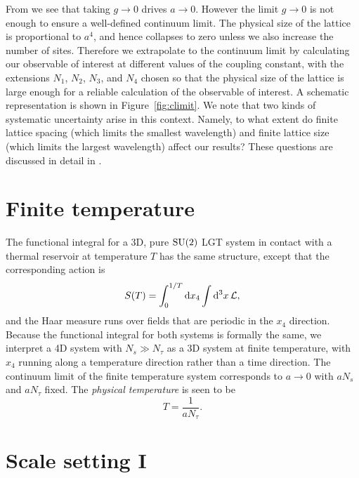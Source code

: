 From  we see that taking $g\to0$ drives $a\to0$.
However the limit $g\to0$ is not enough to ensure a well-defined continuum
limit. The physical size of the lattice is proportional to $a^4$, and hence
collapses to zero unless we also increase the number of sites. Therefore
we extrapolate to the continuum limit by calculating our observable
of interest at different values of the coupling constant, with the 
extensions $N_1$, $N_2$, $N_3$, and $N_4$ chosen so that the physical 
size of the lattice is large enough for a reliable calculation of 
the observable of interest. A schematic representation is shown in
Figure~\ref{fig:climit}. We note that two kinds of systematic uncertainty 
arise in this context. Namely, to what extent do finite lattice
spacing (which limits the smallest wavelength) and finite lattice
size (which limits the largest wavelength) affect our results?
These questions are discussed in detail in 
.

\section{Finite temperature}\label{sec:finitetemp}

The functional integral for a 3D, 
pure $\operatorname{SU}(2)$ LGT system in contact with a thermal reservoir at 
temperature $T$ has the same structure, except that the corresponding 
action is
\begin{equation}\label{eq:Tintegral}
  S(T)=\int_0^{1/T}\dd{x_4}\int\dd[3]{x}\mathcal{L},
\end{equation}
and the Haar measure runs over fields that are periodic in the
$x_4$ direction. Because the functional integral for both systems is
formally the same, we interpret a 4D system with $N_s\gg N_\tau$ as
a 3D system at finite temperature, with $x_4$ running along a 
temperature direction rather than a time direction. 
The continuum limit of the finite temperature system corresponds
to $a\to0$ with $aN_s$ and $aN_\tau$ fixed. The {\it physical
temperature} is seen to be
\begin{equation}
  T=\frac{1}{aN_\tau}.
\end{equation}


\section{Scale setting I}\label{sec:refscales}


